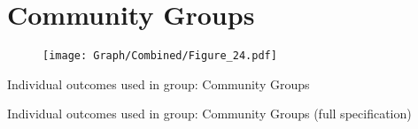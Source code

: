 \documentclass[10pt,a4paper]{article}
\begin{document}
\section{Community Groups}
\begin{table}[H]\centering

\end{table}
\begin{figure}[H]\centering
\texttt{[image: Graph/Combined/Figure\_24.pdf]}
\caption{} \label{fig:Fig_24}
\end{figure}

\begin{table}[H]\centering\caption{Individual outcomes used in group: Community Groups }
\resizebox{\textwidth}{!}{}
\end{table}
\begin{table}[H]\centering\caption{Individual outcomes used in group: Community Groups (full specification)}
\resizebox{\textwidth}{!}{}
\end{table}
\pagebreak
\end{document}
